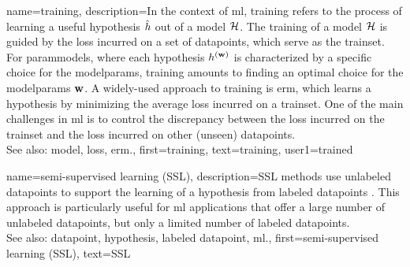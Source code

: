 {name={training}, 
	description={In the context of \gls{ml}, training refers to the process 
		of learning a useful \gls{hypothesis} $\hat{h}$ out of a \gls{model} $\mathcal{H}$. 
		The training of a \gls{model} $\mathcal{H}$ is guided by the \gls{loss} incurred on a set 
		of \glspl{datapoint}, which serve as the \gls{trainset}. For \glspl{parammodel}, 
		where each \gls{hypothesis} $h^{({\bf w})}$ is characterized by a specific 
		choice for the \glspl{modelparam}, training amounts to finding an optimal choice for the 
		\glspl{modelparam} ${\bf w}$. A widely-used approach to training is \gls{erm}, which 
		learns a \gls{hypothesis} by minimizing the average \gls{loss} incurred on a \gls{trainset}. 
		One of the main challenges in \gls{ml} is to control the \gls{discrepancy} between the 
		\gls{loss} incurred on the \gls{trainset} and the \gls{loss} incurred on other (unseen) \glspl{datapoint}.
				\\
		See also: \gls{model}, \gls{loss}, \gls{erm}.},
	first={training},
	text={training}, 
	user1={trained}
}

{name={semi-supervised learning (SSL)}, 
	description={SSL methods use unlabeled \glspl{datapoint}
		to support the learning of a \gls{hypothesis} from \glspl{labeled datapoint} \cite{SemiSupervisedBook}. 
		This approach is particularly useful for \gls{ml} applications that offer a large number of 
		unlabeled \glspl{datapoint}, but only a limited number of \glspl{labeled datapoint}.
			\\
		See also: \gls{datapoint}, \gls{hypothesis}, \gls{labeled datapoint}, \gls{ml}.}, 
	first={semi-supervised learning (SSL)},
	text={SSL} 
}
	
